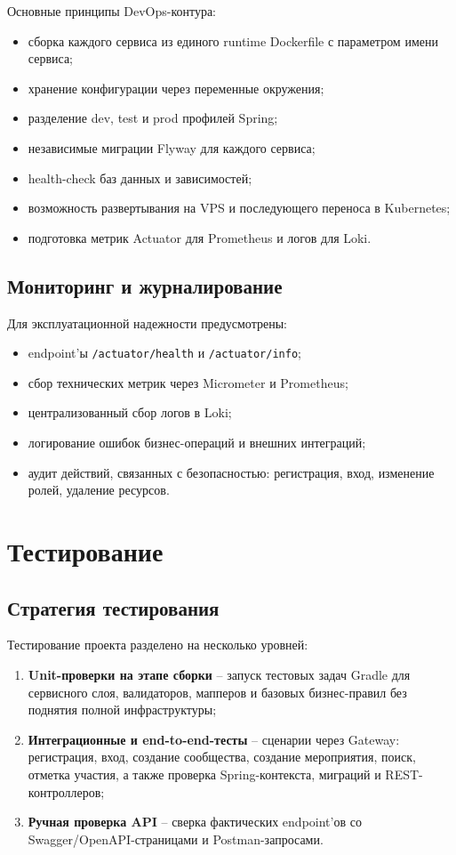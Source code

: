 Основные принципы DevOps-контура:
\begin{itemize}
    \item сборка каждого сервиса из единого runtime Dockerfile с параметром имени сервиса;
    \item хранение конфигурации через переменные окружения;
    \item разделение dev, test и prod профилей Spring;
    \item независимые миграции Flyway для каждого сервиса;
    \item health-check баз данных и зависимостей;
    \item возможность развертывания на VPS и последующего переноса в Kubernetes;
    \item подготовка метрик Actuator для Prometheus и логов для Loki.
\end{itemize}

\subsection{Мониторинг и журналирование}

Для эксплуатационной надежности предусмотрены:
\begin{itemize}
    \item endpoint'ы \texttt{/actuator/health} и \texttt{/actuator/info};
    \item сбор технических метрик через Micrometer и Prometheus;
    \item централизованный сбор логов в Loki;
    \item логирование ошибок бизнес-операций и внешних интеграций;
    \item аудит действий, связанных с безопасностью: регистрация, вход, изменение ролей, удаление ресурсов.
\end{itemize}

\section{Тестирование}

\subsection{Стратегия тестирования}

Тестирование проекта разделено на несколько уровней:
\begin{enumerate}
    \item \textbf{Unit-проверки на этапе сборки} -- запуск тестовых задач Gradle для сервисного слоя, валидаторов, мапперов и базовых бизнес-правил без поднятия полной инфраструктуры;
    \item \textbf{Интеграционные и end-to-end-тесты} -- сценарии через Gateway: регистрация, вход, создание сообщества, создание мероприятия, поиск, отметка участия, а также проверка Spring-контекста, миграций и REST-контроллеров;
    \item \textbf{Ручная проверка API} -- сверка фактических endpoint'ов со Swagger/OpenAPI-страницами и Postman-запросами.
\end{enumerate}

